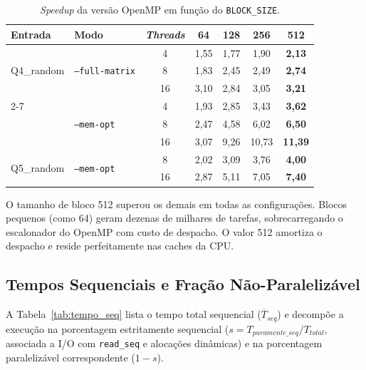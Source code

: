 \begin{table}[H]
\centering
\small
\caption{\textit{Speedup} da versão OpenMP em função do \texttt{BLOCK\_SIZE}.}
\label{tab:blocksize}
\begin{tabular}{@{}llccccc@{}}
\toprule
\textbf{Entrada} & \textbf{Modo} & \textbf{\textit{Threads}} & \textbf{64} & \textbf{128} & \textbf{256} & \textbf{512} \\ \midrule
\multirow{3}{*}{Q4\_random} & \multirow{3}{*}{\texttt{--full-matrix}} 
   & 4  & 1{,}55 & 1{,}77 & 1{,}90 & \textbf{2{,}13} \\
 & & 8  & 1{,}83 & 2{,}45 & 2{,}49 & \textbf{2{,}74} \\
 & & 16 & 3{,}10 & 2{,}84 & 3{,}05 & \textbf{3{,}21} \\ \cmidrule(l){2-7}
\multirow{3}{*}{Q4\_random} & \multirow{3}{*}{\texttt{--mem-opt}} 
   & 4  & 1{,}93 & 2{,}85 & 3{,}43 & \textbf{3{,}62} \\
 & & 8  & 2{,}47 & 4{,}58 & 6{,}02 & \textbf{6{,}50} \\
 & & 16 & 3{,}07 & 9{,}26 & 10{,}73 & \textbf{11{,}39} \\ \midrule
\multirow{2}{*}{Q5\_random} & \multirow{2}{*}{\texttt{--mem-opt}} 
   & 8  & 2{,}02 & 3{,}09 & 3{,}76 & \textbf{4{,}00} \\
 & & 16 & 2{,}87 & 5{,}11 & 7{,}05 & \textbf{7{,}40} \\ \bottomrule
\end{tabular}
\end{table}

O tamanho de bloco 512 superou os demais em todas as configurações. Blocos pequenos (como 64) geram dezenas de milhares de tarefas, sobrecarregando o escalonador do OpenMP com custo de despacho. O valor 512 amortiza o despacho e reside perfeitamente nas caches da CPU.

\subsection{Tempos Sequenciais e Fração Não-Paralelizável}
\label{sec:fracao_seq}

A Tabela~\ref{tab:tempo_seq} lista o tempo total sequencial ($\overline{T}_{seq}$) e decompõe a execução na porcentagem estritamente sequencial ($s = T_{puramente\_seq} / T_{total}$, associada a I/O com \texttt{read\_seq} e alocações dinâmicas) e na porcentagem paralelizável correspondente ($1 - s$).

